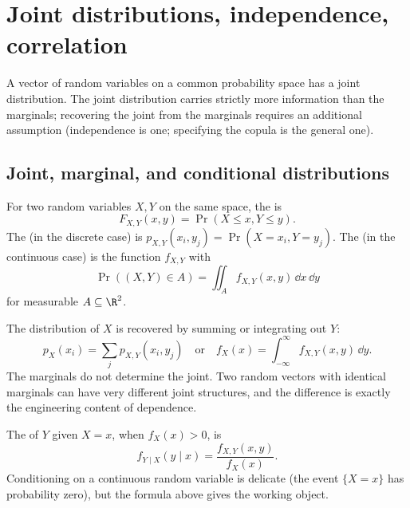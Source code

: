 \section{Joint distributions, independence, correlation}

A vector of random variables on a common probability space has a
joint distribution. The joint distribution carries strictly more
information than the marginals; recovering the joint from the
marginals requires an additional assumption (independence is one;
specifying the copula is the general one).

\subsection{Joint, marginal, and conditional distributions}

For two random variables $X, Y$ on the same space, the
 is
\[
F_{X, Y}(x, y) = \Pr(X \leq x, Y \leq y).
\]
The  (in the discrete case) is $p_{X, Y}(x_{i},
y_{j}) = \Pr(X = x_{i}, Y = y_{j})$. The  (in
the continuous case) is the function $f_{X, Y}$ with
\[
\Pr((X, Y) \in A) = \iint_{A} f_{X, Y}(x, y) \,\dd x \,\dd y
\]
for measurable $A \subseteq \R^{2}$.

The  distribution of $X$ is recovered by summing
or integrating out $Y$:
\[
p_{X}(x_{i}) = \sum_{j} p_{X, Y}(x_{i}, y_{j})
\quad\text{or}\quad
f_{X}(x) = \int_{-\infty}^{\infty} f_{X, Y}(x, y) \,\dd y.
\]
The marginals do not determine the joint. Two random vectors with
identical marginals can have very different joint structures, and
the difference is exactly the engineering content of dependence.

The  of $Y$ given $X = x$, when
$f_{X}(x) > 0$, is
\[
f_{Y \mid X}(y \mid x) = \frac{f_{X, Y}(x, y)}{f_{X}(x)}.
\]
Conditioning on a continuous random variable is delicate (the event
$\{X = x\}$ has probability zero), but the formula above gives the
working object.

